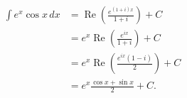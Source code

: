 \begin{align} \int e^x \cos x \, dx &= \operatorname{Re}\left(\frac{e^{(1+i)x}}{1+i}\right) + C \\[6pt] &= e^x\operatorname{Re}\left(\frac{e^{ix}}{1+i}\right) +C \\[6pt] &= e^x\operatorname{Re}\left(\frac{e^{ix}(1-i)}{2}\right) +C \\[6pt] &= e^x \frac{\cos x + \sin x}{2} +C. \end{align}
